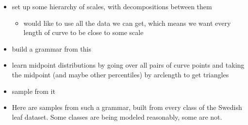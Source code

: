 

\begin{itemize}
\item set up some hierarchy of scales, with decompositions between them

\begin{itemize}
\item would like to use all the data we can get, which means we want
      every length of curve to be close to some scale
\end{itemize}

\item build a grammar from this
\item learn midpoint distributions by going over all pairs of curve
    points and taking the midpoint (and maybe other percentiles) by
    arclength to get triangles
\item sample from it
\item Here are samples from such a grammar, built from every class of
    the Swedish leaf dataset. Some classes are being modeled
    reasonably, some are not.
\end{itemize}




